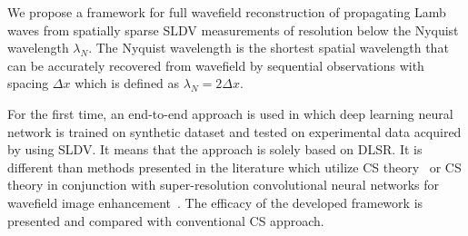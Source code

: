 We propose a framework for full wavefield reconstruction of propagating Lamb waves from spatially sparse SLDV measurements of resolution below the Nyquist wavelength $\lambda_N$. 
The Nyquist wavelength is the shortest spatial wavelength that can be accurately recovered from wavefield by sequential observations with spacing $\Delta x$ which is defined as $\lambda_N = 2 \Delta x$. 

For the first time, an end-to-end approach is used in which deep learning neural network is trained on synthetic dataset and tested on experimental data acquired by using SLDV.
It means that the approach is solely based on DLSR.
It is different than methods presented in the literature which utilize CS theory~\cite{Harley2013,KeshmiriEsfandabadi2018} or CS theory in conjunction with super-resolution convolutional neural networks for wavefield image enhancement~\cite{KeshmiriEsfandabadi2020}.
The efficacy of the developed framework is presented and compared with conventional CS approach.  
